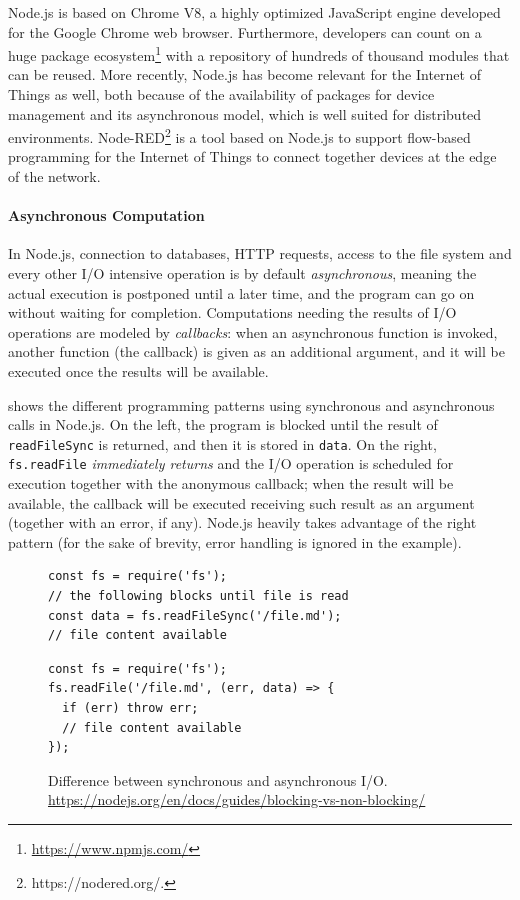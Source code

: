 Node.js is based on Chrome V8, a highly optimized JavaScript engine developed for the Google Chrome web browser. 
Furthermore, developers can count on a huge package ecosystem\footnote{\url{https://www.npmjs.com/}} with a repository of hundreds of thousand modules that can be reused.
More recently, Node.js has become relevant for the Internet of Things as well, both because of the availability of packages for device management and its asynchronous model, which is well suited for distributed environments.
Node-RED\footnote{https://nodered.org/.} is a tool based on Node.js to support flow-based programming for the Internet of Things to
connect together devices at the edge of the network.

\paragraph{Asynchronous Computation}
In Node.js, connection to databases, HTTP requests, access to the file system and every other I/O intensive operation is by default \emph{asynchronous}, meaning the actual execution is postponed until a later time, and the program can go on without waiting for completion.
Computations needing the results of I/O operations are modeled by \emph{callbacks}: when an asynchronous function is invoked, another function (the callback) is given as an additional argument, and it will be executed once the results will be available.

 shows the different programming patterns using synchronous and asynchronous calls in Node.js.
On the left, the program is blocked until the result of \lstinline{readFileSync} is returned, and then it is stored in \lstinline{data}.
On the right, \lstinline{fs.readFile} \emph{immediately returns} and the I/O operation is scheduled for execution together with the anonymous callback; when the result will be available, the callback will be executed receiving such result as an argument (together with an error, if any).
Node.js heavily takes advantage of the right pattern (for the sake of brevity, error handling is ignored in the example).

\begin{figure}[h]
\begin{minipage}{.5\textwidth}
\begin{lstlisting}
const fs = require('fs');
// the following blocks until file is read
const data = fs.readFileSync('/file.md');
// file content available
\end{lstlisting}
\end{minipage}
\begin{minipage}{.5\textwidth}
\begin{lstlisting}
const fs = require('fs');
fs.readFile('/file.md', (err, data) => {
  if (err) throw err;
  // file content available
});
\end{lstlisting}
\end{minipage}
\caption{Difference between synchronous and asynchronous I/O. \url{https://nodejs.org/en/docs/guides/blocking-vs-non-blocking/}}
\label{lst:async}
\end{figure}

